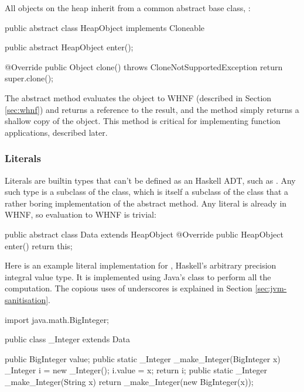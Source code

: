 \documentclass[dissertation.tex]{subfiles}
\begin{document}
{{        All objects on the heap inherit from a common abstract base class, :

        \begin{javafigure}
        public abstract class HeapObject implements Cloneable {
            public abstract HeapObject enter();

            @Override
            public Object clone() throws CloneNotSupportedException {
                return super.clone();
            }
        }
        \end{javafigure}

        The abstract  method evaluates the object to WHNF (described in Section \ref{sec:whnf}) and returns
        a reference to the result, and the  method simply returns a shallow copy of the object. This method
        is critical for implementing function applications, described later.

        \subsubsection{Literals}\label{sec:literals}
        {
            
            Literals are builtin types that can't be defined as an Haskell ADT, such as . Any such type
            is a subclass of the  class, which is itself a subclass of the  class that a
            rather boring implementation of the abstract  method. Any literal is already in WHNF, so
            evaluation to WHNF is trivial:

            \begin{javafigure}
            public abstract class Data extends HeapObject {
                @Override
                public HeapObject enter() {
                    return this;
                }
            }
            \end{javafigure}

            Here is an example literal implementation for , Haskell's arbitrary precision integral
            value type. It is implemented using Java's  class to perform all the computation. The
            copious uses of underscores is explained in Section \ref{sec:jvm-sanitisation}.

            \begin{javafigure}
            import java.math.BigInteger;

            public class _Integer extends Data {
                public BigInteger value;
                public static _Integer _make_Integer(BigInteger x) {
                    _Integer i = new _Integer();
                    i.value = x;
                    return i;
                }
                public static _Integer _make_Integer(String x) {
                    return _make_Integer(new BigInteger(x));
                }

}
\end{javafigure}}}}
\end{document}
